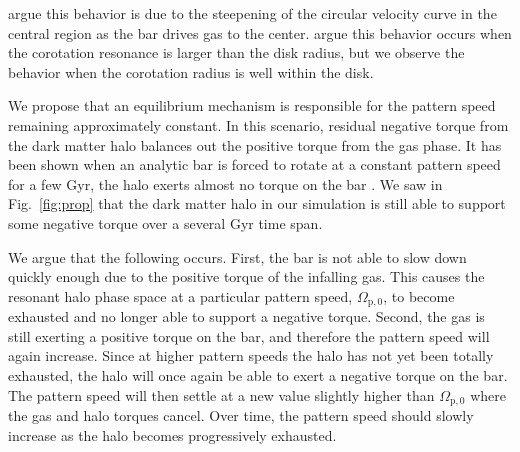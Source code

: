 \documentclass[twocolumn,linenumbers,trackchanges]{aastex631}
\begin{document}
\citet{1993AA...268...65F} argue this behavior is due to the steepening of the
circular velocity curve in the central region as the bar drives gas to the
center. \citet{2009ApJ...707..218V} argue this behavior occurs when the
corotation resonance is larger than the disk radius, but we observe the behavior
when the corotation radius is well within the disk.


We propose that an equilibrium mechanism is responsible for the pattern speed
remaining approximately constant. In this scenario, residual negative torque
from the dark matter halo balances out the positive torque from the gas phase.
It has been shown when an analytic bar is forced to rotate at a constant pattern
speed for a few Gyr, the halo exerts almost no torque on the bar
\citep{2022MNRAS.513..768C}. We saw in Fig.~\ref{fig:prop} that the dark matter
halo in our simulation is still able to support some negative torque over a
several Gyr time span.

We argue that the following occurs. First, the bar is not able to slow down
quickly enough due to the positive torque of the infalling gas. This causes
the resonant halo phase space at a particular pattern speed, $\Omega_{\textrm{p},0}$,
to become exhausted and no longer able to support a negative torque. Second,
the gas is still exerting a positive torque on the bar, and therefore the
pattern speed will again increase. Since at higher pattern speeds the halo has
not yet been totally exhausted, the halo will once again be able to exert a
negative torque on the bar. The pattern speed will then settle at a new value
slightly higher than $\Omega_{\textrm{p},0}$ where the gas and halo torques cancel.
Over time, the pattern speed should slowly increase as the halo becomes
progressively exhausted.
\end{document}
